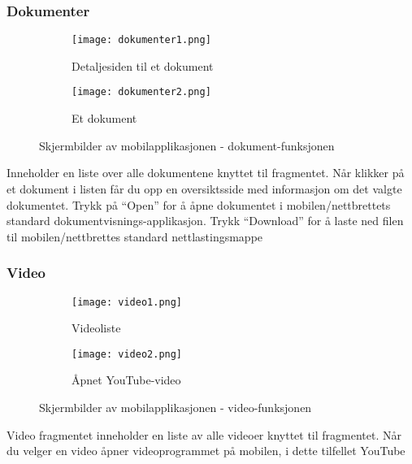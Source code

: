 \documentclass[../main.tex]{subfiles}
\begin{document}
\subsubsection{Dokumenter}

\begin{figure}[H]
        \centering
        \begin{subfigure}[b]{0.4\textwidth}
                \centering
                \texttt{[image: dokumenter1.png]}
                \caption{Detaljesiden til et dokument}
        \end{subfigure}
        \quad
        \begin{subfigure}[b]{0.4\textwidth}
                \centering
                \texttt{[image: dokumenter2.png]}
                \caption{Et dokument}
        \end{subfigure}
        \caption{Skjermbilder av mobilapplikasjonen - dokument-funksjonen}
\end{figure}

Inneholder en liste over alle dokumentene knyttet til fragmentet. Når klikker på et dokument i listen får du opp en oversiktsside med informasjon om det valgte dokumentet. Trykk på “Open” for å åpne dokumentet i mobilen/nettbrettets standard dokumentvisnings-applikasjon. Trykk “Download” for å laste ned filen til mobilen/nettbrettes standard nettlastingsmappe

\subsubsection{Video}

\begin{figure}[H]
        \centering
        \begin{subfigure}[b]{0.4\textwidth}
                \centering
                \texttt{[image: video1.png]}
                \caption{Videoliste}
        \end{subfigure}
        \quad
        \begin{subfigure}[b]{0.4\textwidth}
                \centering
                \texttt{[image: video2.png]}
                \caption{Åpnet YouTube-video}
        \end{subfigure}
        \caption{Skjermbilder av mobilapplikasjonen - video-funksjonen}
\end{figure}

Video fragmentet inneholder en liste av alle videoer knyttet til fragmentet. Når du velger en video åpner videoprogrammet på mobilen, i dette tilfellet YouTube
\end{document}
